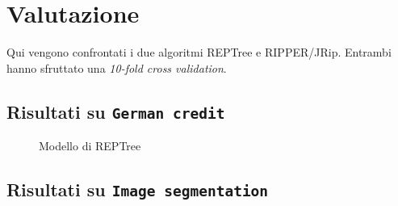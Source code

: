 \chapter{Valutazione}
\label{ch:results}
Qui vengono confrontati i due algoritmi REPTree e RIPPER/JRip. Entrambi hanno sfruttato una \textit{10-fold cross validation}.

\section{Risultati su \texttt{German credit}}

\begin{mdframed}[frametitle=Esecuzione REPTree]
	\footnotesize
\end{mdframed}

\begin{figure}
	\caption{Modello di REPTree}
\end{figure}

\pagebreak

\begin{mdframed}[frametitle=Esecuzione JRip]
	\footnotesize
\end{mdframed}






\pagebreak

\section{Risultati su \texttt{Image segmentation}}

\begin{mdframed}[frametitle=Esecuzione REPTree]
	\scriptsize
\end{mdframed}

